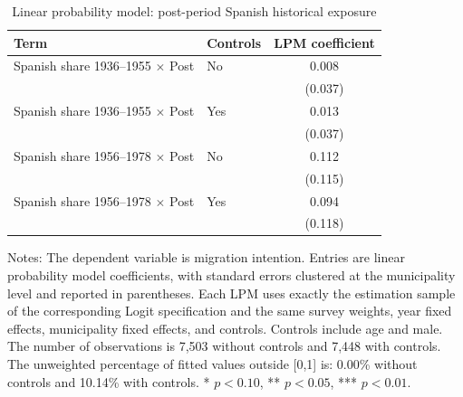 \begin{table}[!htbp]
\normalsize
\renewcommand{\arraystretch}{1.25}
\setlength{\tabcolsep}{6pt}
\centering
\caption{Linear probability model: post-period Spanish historical exposure}
\label{tab:lpm_post_share_mfx_stata}
\begin{tabular}{llc}
\hline
Term & Controls & LPM coefficient \\
\hline
Spanish share 1936--1955 \(\times\) Post & No & 0.008 \\
 & & (0.037) \\
Spanish share 1936--1955 \(\times\) Post & Yes & 0.013 \\
 & & (0.037) \\
\addlinespace
Spanish share 1956--1978 \(\times\) Post & No & 0.112 \\
 & & (0.115) \\
Spanish share 1956--1978 \(\times\) Post & Yes & 0.094 \\
 & & (0.118) \\
\hline
\end{tabular}
\par\vspace{1.5mm}
\begin{minipage}{\textwidth}
{\footnotesize Notes: The dependent variable is migration intention. Entries are linear probability model coefficients, with standard errors clustered at the municipality level and reported in parentheses. Each LPM uses exactly the estimation sample of the corresponding Logit specification and the same survey weights, year fixed effects, municipality fixed effects, and controls. Controls include age and male. The number of observations is        7,503 without controls and        7,448 with controls. The unweighted percentage of fitted values outside [0,1] is:  0.00\% without controls and 10.14\% with controls. * \(p<0.10\), ** \(p<0.05\), *** \(p<0.01\).}
\end{minipage}
\end{table}
